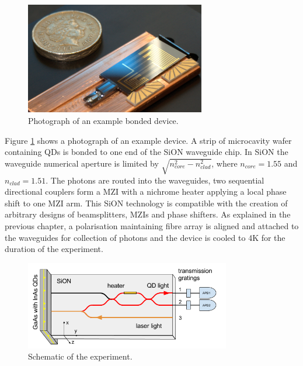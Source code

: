 \begin{figure}[h!] \begin{center}
\includegraphics[width=0.7\textwidth]{images/h2.jpg} \caption{Photograph of an
example bonded device.} \label{fig:photo} \end{center} \end{figure}

Figure \ref{fig:photo} shows a photograph of an example device. A strip of
microcavity wafer containing QDs is bonded to one end of the SiON waveguide
chip.  In SiON the waveguide numerical aperture is limited by $\sqrt{n_{core}^2 - n_{clad}^2}$, where $n_{core} =
\mathrm{1.55}$ and $n_{clad} = \mathrm{1.51}$.  The photons are routed into the waveguides, two sequential
directional couplers form a MZI with a nichrome heater applying a local phase
shift to one MZI arm. This SiON technology is compatible with the creation of
arbitrary designs of beamsplitters, MZIs and phase shifters. As explained in the
previous chapter, a polarisation maintaining fibre array is aligned and attached
to the waveguides for collection of photons and the device is cooled to 4K for
the duration of the experiment.

\begin{figure}[h!] \begin{center}
\includegraphics[width=0.8\textwidth]{images/hyb.png} \caption{Schematic of the
experiment.} \label{fig:schem} \end{center} \end{figure}

